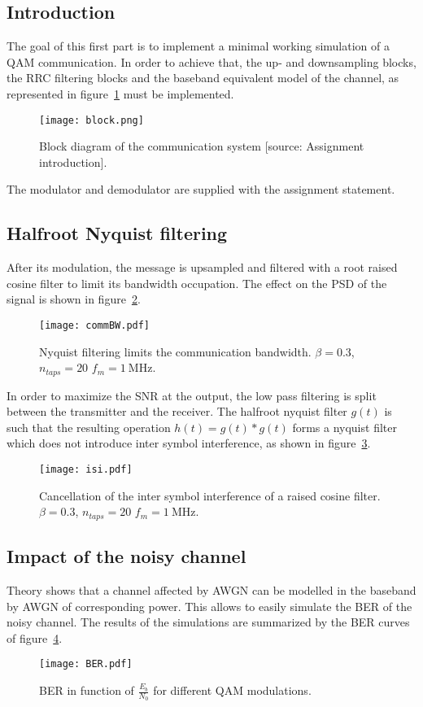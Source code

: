 \subsection{Introduction}
The goal of this first part is to implement a minimal working simulation of a QAM communication.
In order to achieve that, the up- and downsampling blocks, the RRC filtering blocks and the baseband equivalent model of the channel, as represented in figure~\ref{fig:chain} must be implemented.
\begin{figure}[htbp]
\centering
\texttt{[image: block.png]}
\caption{Block diagram of the communication system [source: Assignment introduction].\label{fig:chain}}
\end{figure}
The modulator and demodulator are supplied with the assignment statement.

\subsection{Halfroot Nyquist filtering}
After its modulation, the message is upsampled and filtered with a root raised cosine filter to limit its bandwidth occupation.
The effect on the PSD of the signal is shown in figure~\ref{fig:LPF}.
\begin{figure}[htbp]
\centering
\texttt{[image: commBW.pdf]}
\caption{Nyquist filtering limits the communication bandwidth. $\beta = 0.3$, $n_{taps} = 20$ $f_m = \SI{1}{\mega\hertz}.$ \label{fig:LPF}}
\end{figure}

In order to maximize the SNR at the output, the low pass filtering is split between the transmitter and the receiver.
The halfroot nyquist filter $g(t)$ is such that the resulting operation $h(t) = g(t)*g(t)$ forms a nyquist filter which does not introduce inter symbol interference, as shown in figure~\ref{fig:noISI}.
\begin{figure}
\centering
\texttt{[image: isi.pdf]}
\caption{Cancellation of the inter symbol interference of a raised cosine filter. $\beta = 0.3$, $n_{taps} = 20$ $f_m = \SI{1}{\mega\hertz}.$\label{fig:noISI}}
\end{figure}

\subsection{Impact of the noisy channel}
Theory shows that a channel affected by AWGN can be modelled in the baseband by AWGN of corresponding power.
This allows to easily simulate the BER of the noisy channel.
The results of the simulations are summarized by the BER curves of figure~\ref{fig:BER}.
\begin{figure}[htbp]
\texttt{[image: BER.pdf]}
\caption{BER in function of $\frac{E_b}{N_0}$ for different QAM modulations.\label{fig:BER}}
\end{figure}

